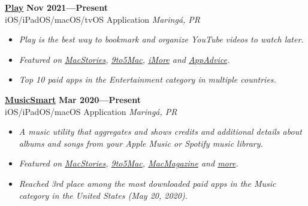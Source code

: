 \documentclass[line,margin]{res}
\begin{document}
\begin{resume}
  {\bf \href{https://apps.apple.com/us/app/id1596506190}{Play}} \hfill {\bf Nov 2021---Present} \\
  iOS/iPadOS/macOS/tvOS Application \hfill {\sl Maring\'a, PR}\\[-6pt]
    \begin{itemize}
    \item {\sl Play is the best way to bookmark and organize YouTube videos to watch later.}
    \item {\sl Featured on \href{https://www.macstories.net/reviews/play-a-fantastic-utility-for-saving-and-organizing-youtube-videos-for-later/}{MacStories}, \href{https://9to5mac.com/2022/02/11/play-app-lets-you-access-youtube-videos-directly-from-your-home-screen/}{9to5Mac}, \href{https://www.imore.com/play-app-saving-youtube-videos-you-want-watch-later}{iMore} and \href{https://appadvice.com/post/bookmark-youtube-videos-to-watch-later-with-the-new-app-play/773234}{AppAdvice}.}
    \item {\sl Top 10 paid apps in the Entertainment category in multiple countries.}
    \end{itemize}
    
  {\bf \href{https://apps.apple.com/us/app/musicsmart/id1512195368}{MusicSmart}} \hfill {\bf Mar 2020---Present} \\
  iOS/iPadOS/macOS Application \hfill {\sl Maring\'a, PR}\\[-6pt]
    \begin{itemize}
    \item {\sl A music utility that aggregates and shows credits and additional details about albums and songs from your Apple Music or Spotify music library.}
    \item {\sl Featured on \href{https://www.macstories.net/reviews/musicsmart-puts-the-spotlight-on-music-credits/}{MacStories}, \href{https://9to5mac.com/2020/05/19/musicsmart-apple-music-app/}{9to5Mac}, \href{https://macmagazine.uol.com.br/post/2020/05/21/aplicativo-brasileiro-musicsmart-traz-detalhes-aprofundados-sobre-as-cancoes-do-apple-music/}{MacMagazine} and \href{https://twitter.com/chockenberry/status/1262803700658999296}{more}.}
    \item {\sl Reached 3rd place among the most downloaded paid apps in the Music category in the United States (May 20, 2020).}
    \end{itemize}
  

\end{resume}
\end{document}
